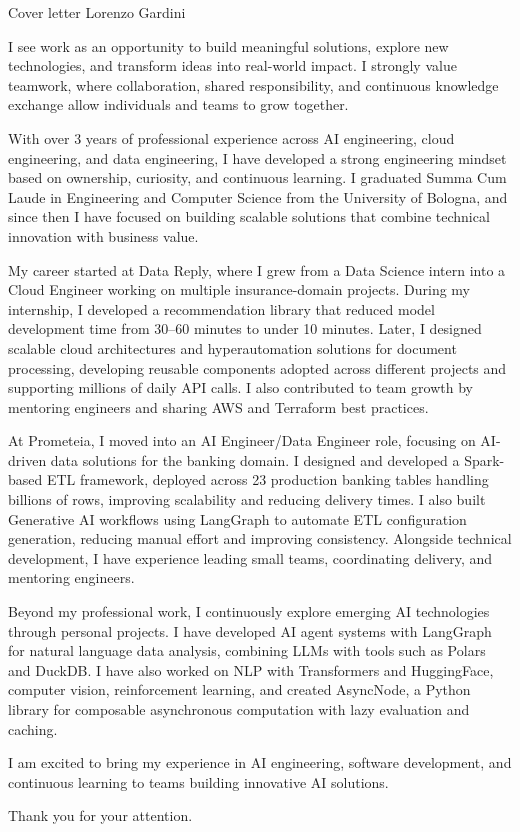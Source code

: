 \documentclass[11pt,a4paper]{letter}
\begin{document}
\begin{letter}{}

\opening{Cover letter Lorenzo Gardini}

I see work as an opportunity to build meaningful solutions, explore new technologies, and transform ideas into real-world impact. I strongly value teamwork, where collaboration, shared responsibility, and continuous knowledge exchange allow individuals and teams to grow together.

With over 3 years of professional experience across AI engineering, cloud engineering, and data engineering, I have developed a strong engineering mindset based on ownership, curiosity, and continuous learning. I graduated Summa Cum Laude in Engineering and Computer Science from the University of Bologna, and since then I have focused on building scalable solutions that combine technical innovation with business value.

My career started at Data Reply, where I grew from a Data Science intern into a Cloud Engineer working on multiple insurance-domain projects. During my internship, I developed a recommendation library that reduced model development time from 30--60 minutes to under 10 minutes. Later, I designed scalable cloud architectures and hyperautomation solutions for document processing, developing reusable components adopted across different projects and supporting millions of daily API calls. I also contributed to team growth by mentoring engineers and sharing AWS and Terraform best practices.

At Prometeia, I moved into an AI Engineer/Data Engineer role, focusing on AI-driven data solutions for the banking domain. I designed and developed a Spark-based ETL framework, deployed across 23 production banking tables handling billions of rows, improving scalability and reducing delivery times. I also built Generative AI workflows using LangGraph to automate ETL configuration generation, reducing manual effort and improving consistency. Alongside technical development, I have experience leading small teams, coordinating delivery, and mentoring engineers.

Beyond my professional work, I continuously explore emerging AI technologies through personal projects. I have developed AI agent systems with LangGraph for natural language data analysis, combining LLMs with tools such as Polars and DuckDB. I have also worked on NLP with Transformers and HuggingFace, computer vision, reinforcement learning, and created AsyncNode, a Python library for composable asynchronous computation with lazy evaluation and caching.

I am excited to bring my experience in AI engineering, software development, and continuous learning to teams building innovative AI solutions.

\closing{Thank you for your attention.}

\end{letter}
\end{document}
